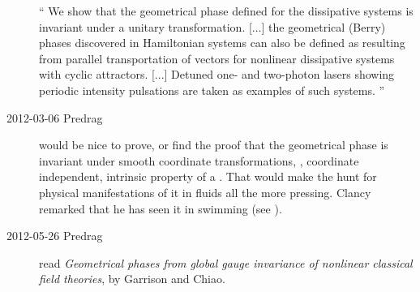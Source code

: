 \begin{description}
``
We show that the geometrical phase defined for the dissipative systems is
invariant under a unitary transformation. [...] the geometrical {(Berry)}
phases discovered in Hamiltonian systems can also be defined as resulting
from parallel transportation of vectors for nonlinear dissipative systems
with cyclic attractors.  [...] Detuned one- and two-photon lasers showing
periodic intensity pulsations are taken as examples of such systems.
''

\item[2012-03-06 Predrag] would be nice to prove, or find the proof that
the geometrical phase is invariant under smooth coordinate
transformations, \ie, coordinate independent, intrinsic property of a
\rpo. That would make the hunt for physical manifestations of it in
fluids all the more pressing. Clancy remarked that he has seen it in swimming
(see ).

\item[2012-05-26 Predrag] read
{\it Geometrical phases from global gauge invariance of nonlinear
classical field theories}, by Garrison and Chiao.



\end{description}
